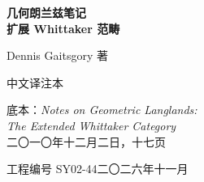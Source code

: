 \thispagestyle{empty}
\begin{center}
\vspace*{2.2cm}

{\Large\bfseries 几何朗兰兹笔记}\\[0.35em]
{\Large\bfseries 扩展 Whittaker 范畴}

\vspace{2.2cm}

{\large Dennis Gaitsgory 著}

\vspace{0.6cm}

{\large 中文译注本}

\vspace{2.6cm}

{\normalsize 底本：\emph{Notes on Geometric Langlands:}\\[0.2em]
\emph{The Extended Whittaker Category}\\[0.5em]
二〇一〇年十二月二日，十七页}

\vfill

{\small 工程编号 SY02-44\quad 二〇二六年十一月}
\end{center}
\clearpage

